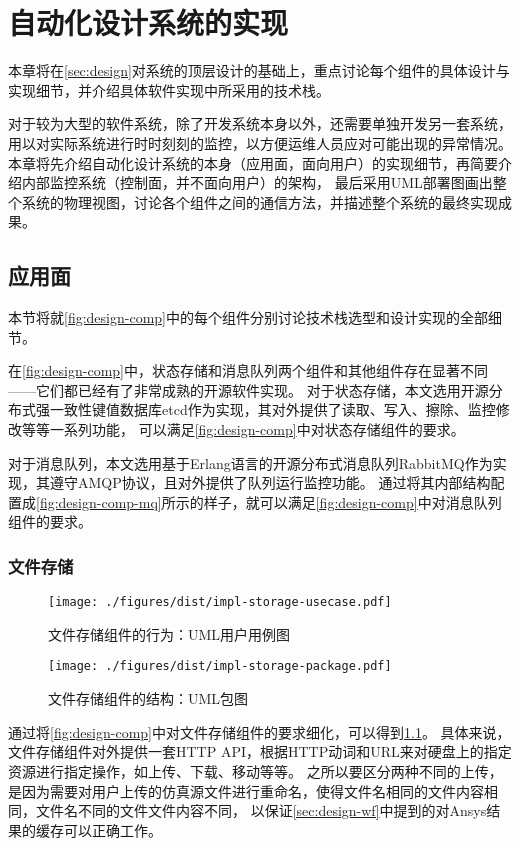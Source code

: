 \documentclass[index]{subfiles}
\begin{document}
\chapter{自动化设计系统的实现}\label{sec:impl}
本章将在\cref{sec:design}对系统的顶层设计的基础上，重点讨论每个组件的具体设计与实现细节，并介绍具体软件实现中所采用的技术栈。

对于较为大型的软件系统，除了开发系统本身以外，还需要单独开发另一套系统，用以对实际系统进行时时刻刻的监控，以方便运维人员应对可能出现的异常情况。
本章将先介绍自动化设计系统的本身（应用面，面向用户）的实现细节，再简要介绍内部监控系统（控制面，并不面向用户）的架构，
最后采用UML部署图画出整个系统的物理视图，讨论各个组件之间的通信方法，并描述整个系统的最终实现成果。

\section{应用面}
本节将就\cref{fig:design-comp}中的每个组件分别讨论技术栈选型和设计实现的全部细节。

在\cref{fig:design-comp}中，状态存储和消息队列两个组件和其他组件存在显著不同——它们都已经有了非常成熟的开源软件实现。
对于状态存储，本文选用开源分布式强一致性键值数据库etcd作为实现，其对外提供了读取、写入、擦除、监控修改等等一系列功能，
可以满足\cref{fig:design-comp}中对状态存储组件的要求。

对于消息队列，本文选用基于Erlang语言的开源分布式消息队列RabbitMQ作为实现，其遵守AMQP协议，且对外提供了队列运行监控功能。
通过将其内部结构配置成\cref{fig:design-comp-mq}所示的样子，就可以满足\cref{fig:design-comp}中对消息队列组件的要求。

\subsection{文件存储}
\begin{figure}[h]
  \centering
  \texttt{[image: ./figures/dist/impl-storage-usecase.pdf]}
  \caption{文件存储组件的行为：UML用户用例图\label{fig:impl-storage-usecase}}
\end{figure}
\begin{figure}[h]
  \centering
  \texttt{[image: ./figures/dist/impl-storage-package.pdf]}
  \caption{文件存储组件的结构：UML包图\label{fig:impl-storage-package}}
\end{figure}
通过将\cref{fig:design-comp}中对文件存储组件的要求细化，可以得到\cref{fig:impl-storage-usecase}。
具体来说，文件存储组件对外提供一套HTTP API，根据HTTP动词和URL来对硬盘上的指定资源进行指定操作，如上传、下载、移动等等。
之所以要区分两种不同的上传，是因为需要对用户上传的仿真源文件进行重命名，使得文件名相同的文件内容相同，文件名不同的文件文件内容不同，
以保证\cref{sec:design-wf}中提到的对Ansys结果的缓存可以正确工作。
\end{document}
